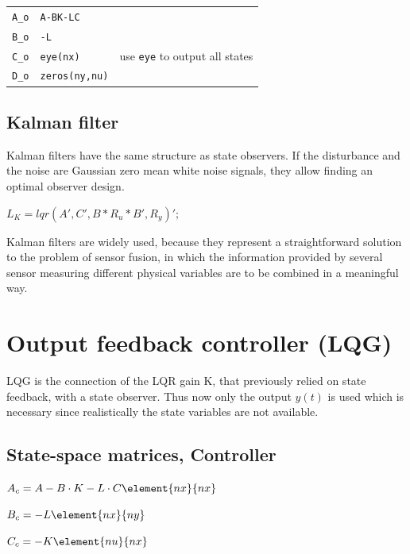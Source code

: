 \documentclass[10pt,a4paper]{scrartcl}
\begin{document}
\begin{multicols*}{3}
	\begin{tabular}{l@{ = }l@{$\qquad$}l}
	\verb+A_o+&\verb+A-BK-LC+\\
	\verb+B_o+&\verb+-L+\\
	\verb+C_o+&\verb+eye(nx)+& use \verb+eye+ to output all states\\
	\verb+D_o+&\verb+zeros(ny,nu)+
	\end{tabular}

	\subsection{Kalman filter}
	
	Kalman filters have the same structure as state observers. If the disturbance and the noise are Gaussian zero mean white noise signals, they allow finding an optimal observer design.
	
	$L_K=lqr(A',C',B*R_u*B',R_y)';$
	
	
	Kalman filters are widely used, because they represent a straightforward solution to the problem of sensor fusion, in which the information provided by several sensor measuring different physical variables are to be combined in a meaningful way.

	\section[LQG]{Output feedback controller (LQG)}

	
	LQG is the connection of the LQR gain K, that previously relied on state feedback, with a state observer. Thus now only the output $y(t)$ is used which is necessary since realistically the state variables are not available.
	
	
	
	\subsection*{State-space matrices, Controller}	
	
	$A_c=A-B\cdot K-L\cdot C\element{nx}{nx}$
	
	$B_c=-L\element{nx}{ny}$
	
	$C_c=-K\element{nu}{nx}$
	

\end{multicols*}
\end{document}
